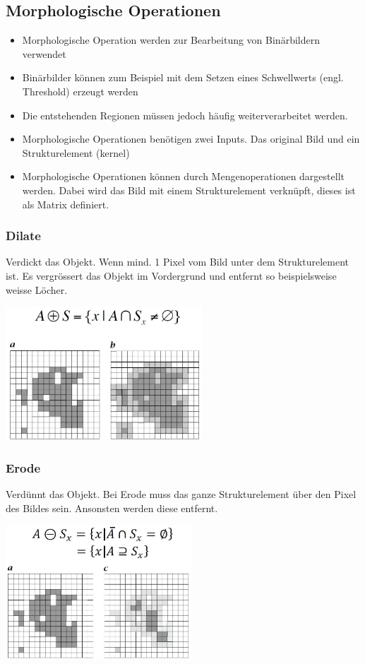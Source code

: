 \subsection{Morphologische Operationen}
\begin{itemize}
	\itemsep0pt
	\item Morphologische Operation werden zur Bearbeitung von Binärbildern verwendet
	\item Binärbilder können zum Beispiel mit dem Setzen eines Schwellwerts (engl. Threshold) erzeugt werden
	\item Die entstehenden Regionen müssen jedoch häufig weiterverarbeitet werden.
	\item Morphologische Operationen benötigen zwei Inputs. Das original Bild und ein Strukturelement (kernel)
	\item Morphologische Operationen können durch Mengenoperationen dargestellt werden. Dabei wird das Bild mit einem Strukturelement verknüpft, dieses ist als Matrix definiert.
\end{itemize}

\subsubsection{Dilate}
Verdickt das Objekt. Wenn mind. 1 Pixel vom Bild unter dem Strukturelement ist. Es vergrössert das Objekt im Vordergrund und entfernt so beispielsweise weisse Löcher. 
\begin{center}
	\includegraphics[height=5cm,keepaspectratio]{images/sw01/Dilate.JPG}
\end{center}


\subsubsection{Erode}
Verdünnt das Objekt. Bei Erode muss das ganze Strukturelement über den Pixel des Bildes sein. Ansonsten werden diese entfernt.
\begin{center}
	\includegraphics[height=5cm,keepaspectratio]{images/sw01/Erode.JPG}
\end{center}

